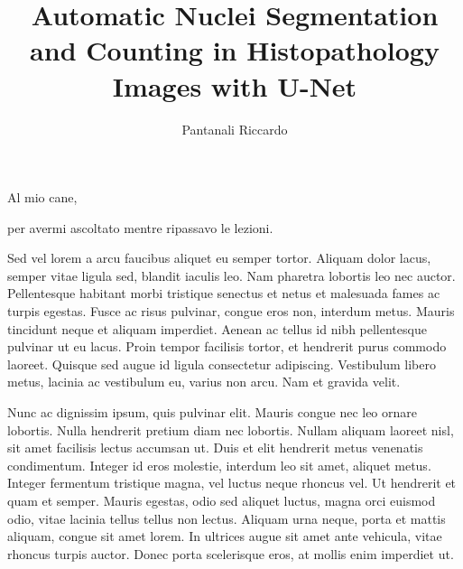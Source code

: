\documentclass[target=bach,aauheader=,style=]{thud}
\title{Automatic Nuclei Segmentation and Counting in Histopathology Images with U-Net}
\author{Pantanali Riccardo}
\begin{document}
\maketitle

\begin{dedication}
	Al mio cane,\par per avermi ascoltato mentre ripassavo le lezioni.
\end{dedication}

\acknowledgements
Sed vel lorem a arcu faucibus aliquet eu semper tortor. Aliquam dolor lacus, semper vitae ligula sed, blandit iaculis leo. Nam pharetra lobortis leo nec auctor. Pellentesque habitant morbi tristique senectus et netus et malesuada fames ac turpis egestas. Fusce ac risus pulvinar, congue eros non, interdum metus. Mauris tincidunt neque et aliquam imperdiet. Aenean ac tellus id nibh pellentesque pulvinar ut eu lacus. Proin tempor facilisis tortor, et hendrerit purus commodo laoreet. Quisque sed augue id ligula consectetur adipiscing. Vestibulum libero metus, lacinia ac vestibulum eu, varius non arcu. Nam et gravida velit.

\abstract
Nunc ac dignissim ipsum, quis pulvinar elit. Mauris congue nec leo ornare lobortis. Nulla hendrerit pretium diam nec lobortis. Nullam aliquam laoreet nisl, sit amet facilisis lectus accumsan ut. Duis et elit hendrerit metus venenatis condimentum. Integer id eros molestie, interdum leo sit amet, aliquet metus. Integer fermentum tristique magna, vel luctus neque rhoncus vel. Ut hendrerit et quam et semper. Mauris egestas, odio sed aliquet luctus, magna orci euismod odio, vitae lacinia tellus tellus non lectus. Aliquam urna neque, porta et mattis aliquam, congue sit amet lorem. In ultrices augue sit amet ante vehicula, vitae rhoncus turpis auctor. Donec porta scelerisque eros, at mollis enim imperdiet ut. 

\tableofcontents



\mainmatter

\end{document}
